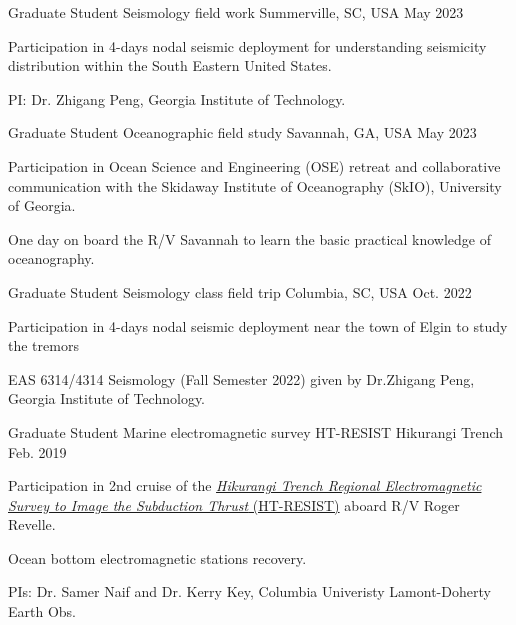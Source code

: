 \begin{cventries}
  \cventry
    {Graduate Student} %
    {Seismology field work} %
    {Summerville, SC, USA} %
    {May 2023} %
    {
      \begin{cvitems} %
        \item {Participation in 4-days nodal seismic deployment for understanding seismicity distribution within the South Eastern United States.}
        \item PI: Dr. Zhigang Peng, Georgia Institute of Technology.
      \end{cvitems}
    }

  \cventry
    {Graduate Student} %
    {Oceanographic field study} %
    {Savannah, GA, USA} %
    {May 2023} %
    {
      \begin{cvitems} %
        \item {Participation in Ocean Science and Engineering (OSE) retreat and collaborative communication with the Skidaway Institute of Oceanography (SkIO), University of Georgia.}
        \item {One day on board the R/V Savannah to learn the basic practical knowledge of oceanography.} 
      \end{cvitems}
    }

  \cventry
    {Graduate Student} %
    {Seismology class field trip} %
    {Columbia, SC, USA} %
    {Oct. 2022} %
    {
      \begin{cvitems} %
        \item {Participation in 4-days nodal seismic deployment near the town of Elgin to study the tremors
        \item EAS 6314/4314 Seismology (Fall Semester 2022) given by Dr.Zhigang Peng, Georgia Institute of Technology.}
      \end{cvitems}
    }

  \cventry
    {Graduate Student} %
    {Marine electromagnetic survey HT-RESIST} %
    {Hikurangi Trench} %
    {Feb. 2019} %
    {
      \begin{cvitems} %
        \item {Participation in 2nd cruise of the \href{https://avnewman.github.io/KIVU/}{\textit{Hikurangi Trench Regional Electromagnetic Survey to Image the Subduction Thrust} (HT-RESIST)} aboard R/V Roger Revelle.}
        \item {Ocean bottom electromagnetic stations recovery.}
        \item PIs: Dr. Samer Naif and Dr. Kerry Key, Columbia Univeristy Lamont-Doherty Earth Obs.
      \end{cvitems}
    }


\end{cventries}
